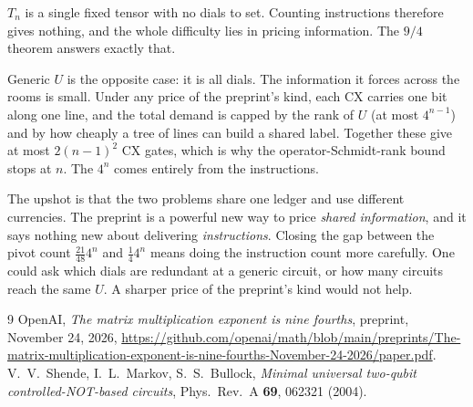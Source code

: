 \documentclass[11pt]{article}
\begin{document}
$T_n$ is a single fixed tensor with no dials to set. Counting instructions therefore gives nothing,
and the whole difficulty lies in pricing information. The $9/4$ theorem answers exactly that.

Generic $U$ is the opposite case: it is all dials. The information it forces across the rooms is
small. Under any price of the preprint's kind, each CX carries one bit along one line, and the
total demand is capped by the rank of $U$ (at most $4^{n-1}$) and by how cheaply a tree of lines
can build a shared label. Together these give at most $2(n-1)^2$ CX gates, which is why the
operator-Schmidt-rank bound stops at $n$. The $4^n$ comes entirely from the instructions.

The upshot is that the two problems share one ledger and use different currencies. The preprint is
a powerful new way to price \emph{shared information}, and it says nothing new about delivering
\emph{instructions}. Closing the gap between the pivot count $\tfrac{21}{48}4^n$ and
$\tfrac14 4^n$ means doing the instruction count more carefully. One could ask which dials are
redundant at a generic circuit, or how many circuits reach the same $U$. A sharper price of the
preprint's kind would not help.

\begin{thebibliography}{9}
 OpenAI, \emph{The matrix multiplication exponent is nine fourths}, preprint,
  November 24, 2026,
  \url{https://github.com/openai/math/blob/main/preprints/The-matrix-multiplication-exponent-is-nine-fourths-November-24-2026/paper.pdf}.
 V.~V.~Shende, I.~L.~Markov, S.~S.~Bullock, \emph{Minimal universal two-qubit
  controlled-NOT-based circuits}, Phys.\ Rev.\ A \textbf{69}, 062321 (2004).
\end{thebibliography}
\end{document}

